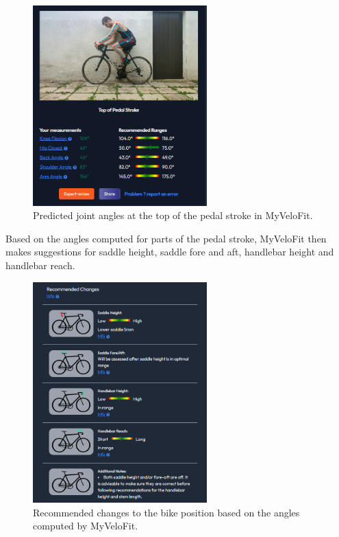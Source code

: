 \begin{figure}[htbp]
    \centering
    \includegraphics[width=0.6\textwidth]{obrazky-figures/myvelofit_top.png}
    \caption{Predicted joint angles at the top of the pedal stroke in MyVeloFit.}
    \label{fig:myvelofit_top}
\end{figure}

Based on the angles computed for parts of the pedal stroke, MyVeloFit then makes suggestions for saddle height, saddle fore and aft, handlebar height and handlebar reach.

\begin{figure}[htbp]
    \centering
    \includegraphics[width=0.6\textwidth]{obrazky-figures/myvelofit_suggestions.png}
    \caption{Recommended changes to the bike position based on the angles computed by MyVeloFit.}
    \label{fig:myvelofit_suggestions}
\end{figure}

